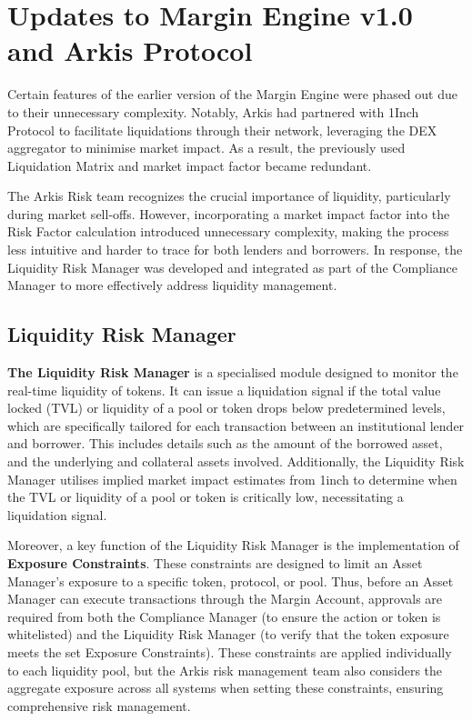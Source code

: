 \documentclass[conference]{IEEEtran}
\begin{document}
\section{Updates to Margin Engine v1.0 and Arkis Protocol}
Certain features of the earlier version of the Margin Engine were phased out due to their unnecessary complexity. Notably, Arkis had partnered with 1Inch Protocol to facilitate liquidations through their network, leveraging the DEX aggregator to minimise market impact. As a result, the previously used Liquidation Matrix and market impact factor became redundant.

The Arkis Risk team recognizes the crucial importance of liquidity, particularly during market sell-offs. However, incorporating a market impact factor into the Risk Factor calculation introduced unnecessary complexity, making the process less intuitive and harder to trace for both lenders and borrowers. In response, the Liquidity Risk Manager was developed and integrated as part of the Compliance Manager to more effectively address liquidity management.


\subsection{Liquidity Risk Manager}
\textbf{The Liquidity Risk Manager} is a specialised module designed to monitor the real-time liquidity of tokens. It can issue a liquidation signal if the total value locked (TVL) or liquidity of a pool or token drops below predetermined levels, which are specifically tailored for each transaction between an institutional lender and borrower. This includes details such as the amount of the borrowed asset, and the underlying and collateral assets involved. Additionally, the Liquidity Risk Manager utilises implied market impact estimates from 1inch to determine when the TVL or liquidity of a pool or token is critically low, necessitating a liquidation signal.

Moreover, a key function of the Liquidity Risk Manager is the implementation of \textbf{Exposure Constraints}. These constraints are designed to limit an Asset Manager’s exposure to a specific token, protocol, or pool. Thus, before an Asset Manager can execute transactions through the Margin Account, approvals are required from both the Compliance Manager (to ensure the action or token is whitelisted) and the Liquidity Risk Manager (to verify that the token exposure meets the set Exposure Constraints). These constraints are applied individually to each liquidity pool, but the Arkis risk management team also considers the aggregate exposure across all systems when setting these constraints, ensuring comprehensive risk management.
\end{document}
